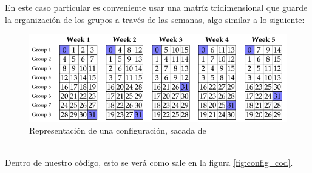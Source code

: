 \documentclass[letter, 10pt]{article}
\begin{document}
En este caso particular es conveniente usar una matríz tridimensional que guarde la organización de los grupos a través de las semanas, algo similar a lo siguiente:
\begin{figure}[h]
    \centering
    \includegraphics[width=\textwidth]{figures/triskarep.png}
    \caption{Representación de una configuración, sacada de \cite{triska2012effective}}
    \label{fig:representation}
\end{figure}
\\
Dentro de nuestro código, esto se verá como sale en la figura \ref{fig:config_cod}.
\end{document}
